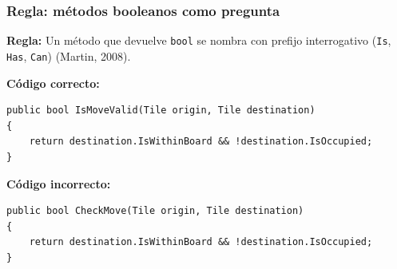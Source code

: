 \subsubsection{Regla: métodos booleanos como pregunta}

\textbf{Regla:} Un método que devuelve \texttt{bool} se nombra con prefijo interrogativo (\texttt{Is}, \texttt{Has}, \texttt{Can}) (Martin, 2008).

\textbf{Código correcto:}
\begin{lstlisting}[style=csharpstyle]
public bool IsMoveValid(Tile origin, Tile destination)
{
    return destination.IsWithinBoard && !destination.IsOccupied;
}
\end{lstlisting}

\textbf{Código incorrecto:}
\begin{lstlisting}[style=csharpstyle]
public bool CheckMove(Tile origin, Tile destination)
{
    return destination.IsWithinBoard && !destination.IsOccupied;
}
\end{lstlisting}
